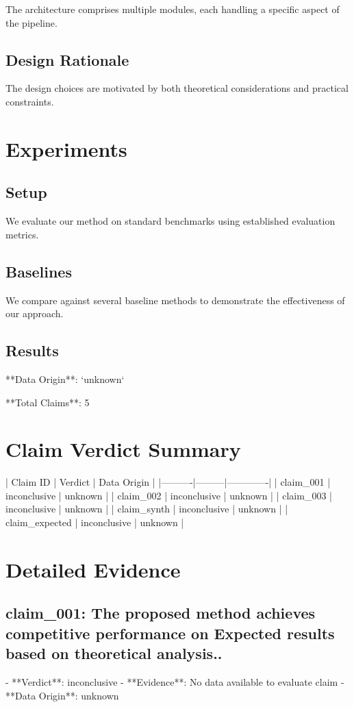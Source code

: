 \documentclass[11pt,a4paper]{article}
\begin{document}
The architecture comprises multiple modules, each handling a specific aspect of the pipeline.

\subsection{Design Rationale}

The design choices are motivated by both theoretical considerations and practical constraints.

\section{Experiments}

\subsection{Setup}

We evaluate our method on standard benchmarks using established evaluation metrics.

\subsection{Baselines}

We compare against several baseline methods to demonstrate the effectiveness of our approach.

\subsection{Results}


**Data Origin**: `unknown`

**Total Claims**: 5

\section{Claim Verdict Summary}

| Claim ID | Verdict | Data Origin |
|----------|---------|-------------|
| claim\_001 | inconclusive | unknown |
| claim\_002 | inconclusive | unknown |
| claim\_003 | inconclusive | unknown |
| claim\_synth | inconclusive | unknown |
| claim\_expected | inconclusive | unknown |

\section{Detailed Evidence}

\subsection{claim_001: The proposed method achieves competitive performance on Expected results based on theoretical analysis..}
- **Verdict**: inconclusive
- **Evidence**: No data available to evaluate claim
- **Data Origin**: unknown
\end{document}
